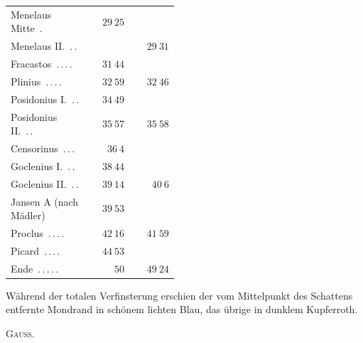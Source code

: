\begin{center}
\begin{tabular}{@{}p{0.47\linewidth}|r|r@{}}
Menelaus Mitte\ \mbox{.} & $29\ 25$ & \\
Menelaus II.\ \mbox{.\,.} &  & $29\ 31$\\
Fracastos\ \mbox{.\,.\,.\,.} & $31\ 44$ & \\
Plinius\ \mbox{.\,.\,.\,.} & $32\ 59$ & $32\ 46$\\
Posidonius I.\ \mbox{.\,.} & $34\ 49$ & \\
Posidonius II.\ \mbox{.\,.} & $35\ 57$ & $35\ 58$\\
Censorinus\ \mbox{.\,.\,.} & $36\ 4$ & \\
Goclenius I.\ \mbox{.\,.} & $38\ 44$ & \\
Goclenius II.\ \mbox{.\,.} & $39\ 14$ & $40\ 6$\\
Jansen A (nach Mädler) & $39\ 53$ & \\
Proclus\ \mbox{.\,.\,.\,.} & $42\ 16$ & $41\ 59$\\
Picard\ \mbox{.\,.\,.\,.} & $44\ 53$ & \\
Ende\ \mbox{.\,.\,.\,.\,.} & $50$ & $49\ 24$\\
\end{tabular}\endgroup\end{center}

Während der totalen Verfinsterung erschien der vom Mittelpunkt des Schattens entfernte Mondrand in schönem lichten Blau, das übrige in dunklem Kupferroth.
\begin{flushright}\textsc{Gauss.}\end{flushright}
